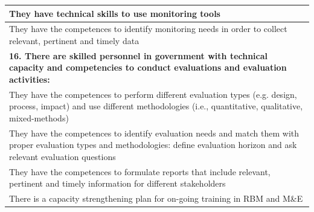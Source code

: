 \documentclass[
  10pt,
]{book}
\begin{document}
\begin{table}
\begin{tabular}[t]{l}
\hline
\hspace{1em}They have technical skills to use monitoring tools\\
\hline
\hspace{1em}They have the competences to identify monitoring needs in order to collect relevant, pertinent and timely data\\
\hline
\multicolumn{1}{l}{\textbf{16. There are skilled personnel in government with technical capacity and competencies to conduct evaluations and evaluation activities:}}\\
\hline
\hspace{1em}They have the competences to perform different evaluation types (e.g. design, process, impact) and use different methodologies (i.e., quantitative, qualitative, mixed-methods)\\
\hline
\hspace{1em}They have the competences to identify evaluation needs and match them with proper evaluation types and methodologies: define evaluation horizon and ask relevant evaluation questions\\
\hline
\hspace{1em}They have the competences to formulate reports that include relevant, pertinent and timely information for different stakeholders\\
\hline
\hspace{1em}There is a capacity strengthening plan for on-going training in RBM and M\&E\\
\hline
\end{tabular}
\end{table}
\end{document}
